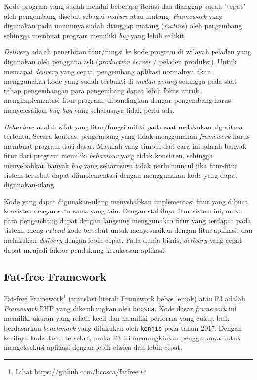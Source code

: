     Kode program yang sudah melalui beberapa iterasi dan dianggap sudah "tepat"
    oleh pengembang disebut sebagai \textit{mature} atau matang.
    \textit{Framework} yang digunakan pada umumnya sudah dianggap matang
    (\textit{mature}) oleh pengembang sehingga membuat program memiliki
    \textit{bug} yang lebih sedikit.
    
    \textit{Delivery} adalah penerbitan fitur/fungsi ke kode program di wilayah
    peladen yang digunakan oleh pengguna asli (\textit{production server} /
    peladen produksi). Untuk mencapai \textit{delivery} yang cepat, pengembang
    aplikasi normalnya akan menggunakan kode yang sudah terbukti di
    \textit{medan perang} sehingga pada saat tahap pengembangan para pengembang
    dapat lebih fokus untuk mengimplementasi fitur program, dibandingkan dengan
    pengembang harus menyelesaikan \textit{bug-bug} yang seharusnya tidak perlu
    ada.
    
    \textit{Behaviour} adalah sifat yang fitur/fungsi miliki pada saat melakukan
    algoritma tertentu. Secara kontras, pengembang yang tidak menggunakan
    \textit{framework} harus membuat program dari dasar. Masalah yang timbul
    dari cara ini adalah banyak fitur dari program memiliki \textit{behaviour}
    yang tidak konsisten, sehingga menyebabkan banyak \textit{bug} yang
    seharusnya tidak perlu muncul jika fitur-fitur sistem tersebut dapat
    diimplementasi dengan menggunakan kode yang dapat digunakan-ulang.
    
    Kode yang dapat digunakan-ulang menyebabkan implementasi fitur yang dibuat
    konsisten dengan satu sama yang lain. Dengan stabilnya fitur sistem ini,
    maka para pengembang dapat dengan langsung menggunakan fitur yang terdapat
    pada sistem, meng-\textit{extend} kode tersebut untuk menyesuaikan dengan
    fitur aplikasi, dan melakukan \textit{delivery} dengan lebih cepat. Pada
    dunia bisnis, \textit{delivery} yang cepat dapat menjadi faktor pendukung
    kesuksesan aplikasi.

\subsection{Fat-free Framework}
    Fat-free Framework\footnote{Lihat https://github.com/bcosca/fatfree.}
    (translasi literal: Framework bebas lemak) atau F3 adalah \textit{Framework}
    PHP yang dikembangkan oleh \texttt{bcosca}. Kode dasar \textit{framework}
    ini memiliki ukuran yang relatif kecil dan memiliki performa yang cukup baik
    berdasarkan \textit{benchmark} yang dilakukan oleh \texttt{kenjis} pada
    tahun 2017\cite{kenjis:framework-benchmark}. Dengan kecilnya kode dasar
    tersebut, maka F3 ini memungkinkan penggunanya untuk mengeksekusi aplikasi
    dengan lebih efisien dan lebih cepat.
    
